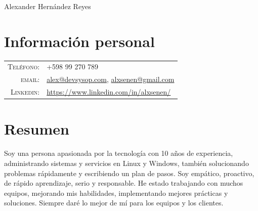 \documentclass[a4paper,12pt]{article}
\begin{document}
\vspace*{-0.5cm}

\pagestyle{empty} %

{\huge Alexander Hern\'andez Reyes}
\hfill
{}\\
\section{Informaci\'on personal}
\begin{tabular}{rl}
    \textsc{Tel\'efono:}     & +598 99 270 789 \\
    \textsc{email:}     & \href{mailto:alex@devsysop.com}{alex@devsysop.com}, \href{mailto:alxsenen@gmail.com}{alxsenen@gmail.com} \\
    \textsc{Linkedin:}     & \href{https://www.linkedin.com/in/alxsenen/}{https://www.linkedin.com/in/alxsenen/} \\
	
\end{tabular}
\section{Resumen}
\justify
Soy una persona apasionada por la tecnología con 10 años de experiencia, administrando sistemas y servicios en Linux y Windows, también solucionando problemas rápidamente y escribiendo un plan de pasos. Soy empático, proactivo, de rápido aprendizaje, serio y responsable.
He estado trabajando con muchos equipos, mejorando mis habilidades, implementando mejores prácticas y soluciones. Siempre daré lo mejor de mí para los equipos y los clientes.

\end{document}
